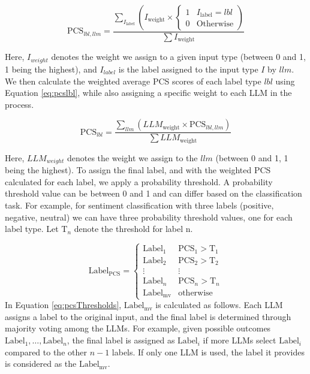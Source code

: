     \begin{multicols}{2}
    
    \noindent
    \footnotesize
    \begin{equation}
        \label{eq:pcslblllm}
        \text{PCS}_{lbl, llm} = \frac{\sum_{I_{\text{label}}
} \left( I_{\text{weight}}
 \times 
        \begin{cases} 
          1 & I_{\text{label}} = lbl \\
          0 & \text{Otherwise} 
        \end{cases} \right)}{\sum I_{\text{weight}}}
    \end{equation}
    \end{multicols}
Here, $I_{weight}$ denotes the weight we assign to a given input type (between 0 and 1, 1 being the highest), and $I_{label}$ is the label assigned to the input type $I$ by $llm$. We then calculate the weighted average PCS scores of each label type $lbl$ using Equation \ref{eq:pcslbl}, while also assigning a specific weight to each LLM in the process.
\begin{multicols}{2}
\noindent
\begin{equation}
    \label{eq:pcslbl}
    \text{PCS}_{lbl} = \frac{\sum_{llm} \left( LLM_{\text{weight}}
 \times 
    \text{PCS}_{lbl, llm} \right)}{\sum LLM_{\text{weight}}
}
\end{equation}
\end{multicols}
Here, $LLM_{weight}$ denotes the weight we assign to the $llm$ (between 0 and 1, 1 being the highest). To assign the final label, and with the weighted PCS calculated for each label, we apply a probability threshold. A probability threshold value can be between 0 and 1 and can differ based on the classification task. For example, for sentiment classification with three labels (positive, negative, neutral) we can have three probability threshold values, one for each label type. Let $\text{T}_{n}$ denote the threshold for label n.

\begin{equation}
\label{eq:pcsThresholds}
\text{Label}_{\text{PCS}} = 
\begin{cases} 
\text{Label}_{1} & \text{PCS}_{1} > \text{T}_{1} \\
\text{Label}_{2} & \text{PCS}_{2} > \text{T}_{2} \\
\vdots & \vdots \\
\text{Label}_{n} & \text{PCS}_{n} > \text{T}_{n} \\
\text{Label}_{\text{mv}} & \text{otherwise}
\end{cases}
\end{equation}
In Equation \ref{eq:pcsThresholds}, $\text{Label}_{\text{mv}}$
  is calculated as follows. Each LLM assigns a label to the original input, and the final label is determined through majority voting among the LLMs. For example, given possible outcomes \(\text{Label}_{1}, \ldots, \text{Label}_{n}\), the final label is assigned as \(\text{Label}_{i}\) if more LLMs select \(\text{Label}_{i}\) compared to the other \(n-1\) labels. If only one LLM is used, the label it provides is considered as the $\text{Label}_{\text{mv}}$.


